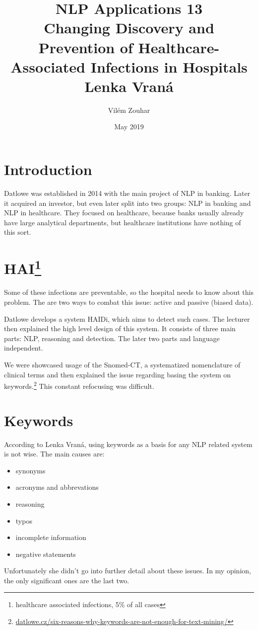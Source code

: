 \documentclass[a4paper]{article}
\begin{document}
\title{NLP Applications 13\\Changing Discovery and Prevention of Healthcare-Associated Infections in Hospitals\\Lenka Vraná}
\author{Vilém Zouhar}
\date{May 2019}
\maketitle

\section*{Introduction}
Datlowe was established in 2014 with the main project of NLP in banking. Later it acquired an investor, but even later split into two groups: NLP in banking and NLP in healthcare. They focused on healthcare, because banks usually already have large analytical departments, but healthcare institutions have nothing of this sort.

\section*{HAI\footnote{healthcare associated infections, 5\% of all cases}}
Some of these infections are preventable, so the hospital needs to know about this problem. The are two ways to combat this issue: active and passive (biased data).

Datlowe develops a system HAIDi, which aims to detect such cases. The lecturer then explained the high level design of this system. It consists of three main parts: NLP, reasoning and detection. The later two parts and language independent.

We were showcased usage of the Snomed-CT, a systematized nomenclature of clinical terms and then explained the issue regarding basing the system on keywords.\footnote{\href{http://datlowe.cz/six-reasons-why-keywords-are-not-enough-for-text-mining/}{datlowe.cz/six-reasons-why-keywords-are-not-enough-for-text-mining/}} This constant refocusing was difficult.

\section*{Keywords}
According to Lenka Vraná, using keywords as a basis for any NLP related system is not wise. The main causes are:
\begin{itemize}
    \item synonyms 
    \item acronyms and abbrevations
    \item reasoning
    \item typos
    \item incomplete information
    \item negative statements
\end{itemize}
Unfortunately she didn't go into further detail about these issues. In my opinion, the only significant ones are the last two.
\end{document}
